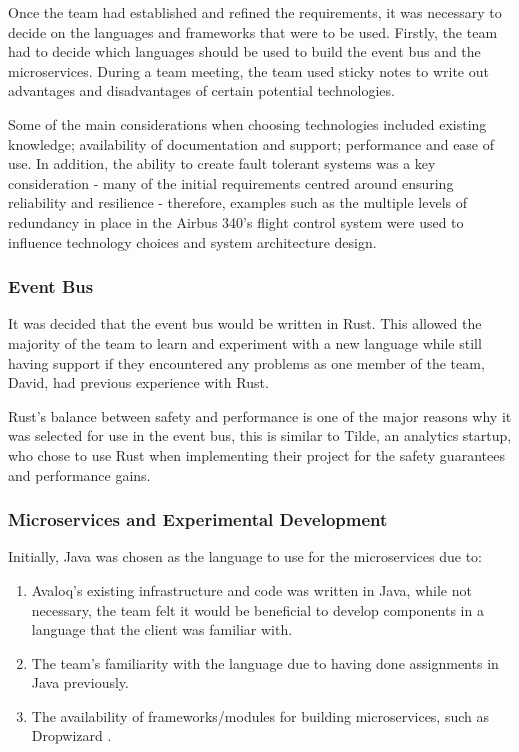 \documentclass{l3proj}
\begin{document}
Once the team had established and refined the requirements, it was necessary to decide on the languages and frameworks that were to be used. Firstly, the team had to decide which languages should be used to build the event bus and the microservices. During a team meeting, the team used sticky notes to write out advantages and disadvantages of certain potential technologies.

Some of the main considerations when choosing technologies included existing knowledge; availability of documentation and support; performance and ease of use. In addition, the ability to create fault tolerant systems was a key consideration - many of the initial requirements centred around ensuring reliability and resilience - therefore, examples such as the multiple levels of redundancy in place in the Airbus 340's flight control system \cite{airbus} were used to influence technology choices and system architecture design.

\subsubsection{Event Bus}
It was decided that the event bus would be written in Rust. This allowed the majority of the team to learn and experiment with a new language while still having support if they encountered any problems as one member of the team, David, had previous experience with Rust.

Rust's balance between safety and performance is one of the major reasons why it was selected for use in the event bus, this is similar to Tilde, an analytics startup, who chose to use Rust when implementing their project \cite{tilde} for the safety guarantees and performance gains.

\subsubsection{Microservices and Experimental Development}
Initially, Java was chosen as the language to use for the microservices due to:

\begin{enumerate}
    \item Avaloq's existing infrastructure and code was written in Java, while not necessary, the team felt it would be beneficial to develop components in a language that the client was familiar with.
    \item The team's familiarity with the language due to having done assignments in Java previously.
    \item The availability of frameworks/modules for building microservices, such as Dropwizard \cite{dropwizard}.
\end{enumerate}
\end{document}
